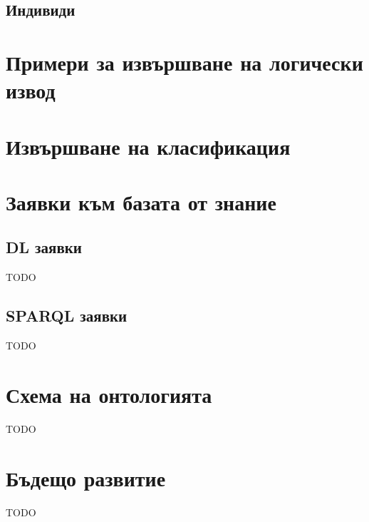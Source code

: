 \documentclass[12pt]{article}
\begin{document}
    
    
    
    \subsection{Индивиди}
    
    
    
    
    

\section{Примери за извършване на логически извод}








\section{Извършване на класификация}






\section{Заявки към базата от знание}

\subsection{DL заявки}

TODO

\subsection{SPARQL заявки}

TODO







\section{Схема на онтологията}

TODO



\section{Бъдещо развитие}

TODO
\end{document}
